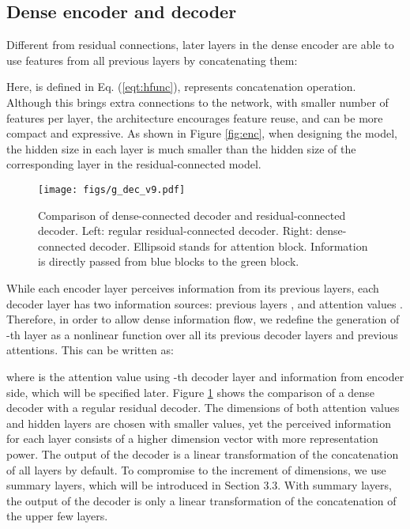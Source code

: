 \documentclass[11pt,a4paper]{article}
\begin{document}
\subsection{Dense encoder and decoder}

Different from residual connections, later layers in the dense encoder are able to use features from all previous layers by concatenating them: 

Here,  is defined in Eq. (\ref{eqt:hfunc}),  represents concatenation operation. 
Although this brings extra connections to the network, with smaller number of features per layer, the architecture encourages feature reuse, and can be more compact and expressive. 
As shown in Figure \ref{fig:enc}, when designing the model, the hidden size in each layer is much smaller than the hidden size of the corresponding layer in the residual-connected model. 

\begin{figure}[!t]
\centering 
\small
\captionsetup{font=small}
\texttt{[image: figs/g\_dec\_v9.pdf]}
\caption{Comparison of dense-connected decoder and residual-connected decoder. Left: regular residual-connected decoder. Right: dense-connected decoder. Ellipsoid stands for attention block. Information is directly passed from blue blocks to the green block. }
\label{fig:dec}
\end{figure} 

While each encoder layer perceives information from its previous layers, each decoder layer  has two information sources: previous layers , and attention values . Therefore, in order to allow dense information flow, we redefine the generation of -th layer as a nonlinear function over all its previous decoder layers and previous attentions. This can be written as: 

where  is the attention value using -th decoder layer and information from encoder side, which will be specified later. 
Figure \ref{fig:dec} shows the comparison of a dense decoder with a regular residual decoder. The dimensions of both attention values and hidden layers are chosen with smaller values, yet the perceived information for each layer consists of a higher dimension vector with more representation power.
The output of the decoder is a linear transformation of the concatenation of all layers by default. To compromise to the increment of dimensions, we use summary layers, which will be introduced in Section 3.3. With summary layers, the output of the decoder is only a linear transformation of the concatenation of the upper few  layers.  
\end{document}
